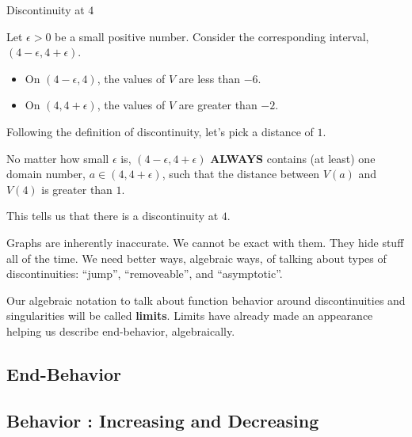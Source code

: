 \documentclass{ximera}
\begin{document}
\begin{explanation} Discontinuity at $4$


Let $\epsilon > 0$ be a small positive number.  Consider the corresponding interval, $(4 - \epsilon, 4 + \epsilon)$.

\begin{itemize}
\item On $(4 - \epsilon, 4)$, the values of $V$ are less than $-6$.
\item On $(4, 4 + \epsilon)$, the values of $V$ are greater than $-2$.
\end{itemize}


Following the definition of discontinuity, let's pick a distance of $1$.


No matter how small $\epsilon$ is, $(4 - \epsilon, 4 + \epsilon)$ \textbf{\textcolor{red!90!darkgray}{ALWAYS}} contains (at least) one domain number, $a \in (4, 4 + \epsilon)$, such that the distance between $V(a)$ and $V(4)$ is greater than $1$.

This tells us that there is a discontinuity at $4$.

\end{explanation}




\begin{notation}


Graphs are inherently inaccurate.  We cannot be exact with them.  They hide stuff all of the time. We need better ways, algebraic ways, of talking about types of discontinuities: ``jump'', ``removeable'', and ``asymptotic''.

Our algebraic notation to talk about function behavior around discontinuities and singularities will be called \textbf{\textcolor{purple!85!blue}{limits}}.  Limits have already made an appearance helping us describe end-behavior, algebraically.
\end{notation}










\subsection*{End-Behavior} 





\subsection*{Behavior : Increasing and Decreasing} 
\end{document}
